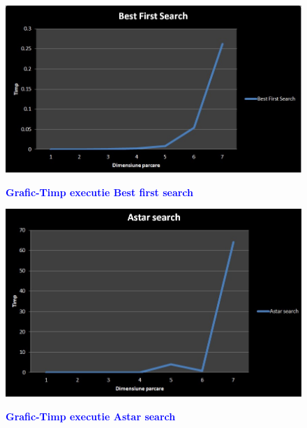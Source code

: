 \documentclass{article}
\begin{document}
\begin{flushleft}
\begin{center}
    \begin{figure}
        \centering
        \includegraphics[width=15cm]{timp-best-first-search.jpg}
        \bfseries \caption{\textbf{\textcolor{blue}{Grafic-Timp executie Best first search}}}
    \end{figure}
\end{center}

\begin{center}
    \begin{figure}
        \centering
        \includegraphics[width=15cm]{timp-astar-search.jpg}
        \bfseries \caption{\textbf{\textcolor{blue}{Grafic-Timp executie Astar search}}}
    \end{figure}
\end{center}


\end{flushleft}
\end{document}
